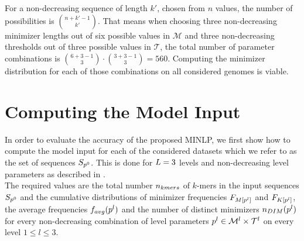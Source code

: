 \documentclass[a4paper,titlepage,onecolumn,oneside,12pt,nenglish,titlepage=firstiscover]{scrbook}
\theoremstyle{plain} %
\theoremstyle{definition} %
\theoremstyle{remark} %
\theoremstyle{plain}
\newcommand{\level}{l}
\newcommand{\averageFrequency}{f_{avg}}
\newcommand{\possibleMinimizerLengths}{\mathcal{M}}
\newcommand{\possibleThresholds}{\mathcal{T}}
\begin{document}
For a non-decreasing sequence of length $k'$, chosen from $n$ values, the number of possibilities is $\binom{n+k'-1}{k'}$. That means when choosing three non-decreasing minimizer lengths out of six possible values in $\possibleMinimizerLengths$ and three non-decreasing thresholds out of three possible values in $\possibleThresholds$, the total number of parameter combinations is $\binom{6+3-1}{3} \cdot \binom{3+3-1}{3} = 560$. Computing the minimizer distribution for each of those combinations on all considered genomes is viable.

\section{Computing the Model Input} \label{sec:computationOfModelInput}
In order to evaluate the accuracy of the proposed MINLP, we first show how to compute the model input for each of the considered datasets which we refer to as the set of sequences $S_{p^{0}}$. This is done for ${L} = 3$ levels and non-decreasing level parameters as described in .\\
The required values are the total number $n_{kmers}$ of $k$-mers in the input sequences $S_{p^{0}}$ and the cumulative distributions of minimizer frequencies $\CDF{\compactZV{M}{\levelParameters{\level}}}$ and $\CDF{\compactZV{K}{\levelParameters{\level}}}$, the average frequencies $\averageFrequency(\levelParameters{\level})$ and the number of distinct \infrequent minimizers $\numberOfDistinctMinimizers{\levelParameters{\level}}$ for every non-decreasing combination of level parameters $\levelParameters{\level} \in \possibleMinimizerLengths^\level \times \possibleThresholds^\level$ on every level $1 \leq \level \leq 3$.\\
\end{document}
